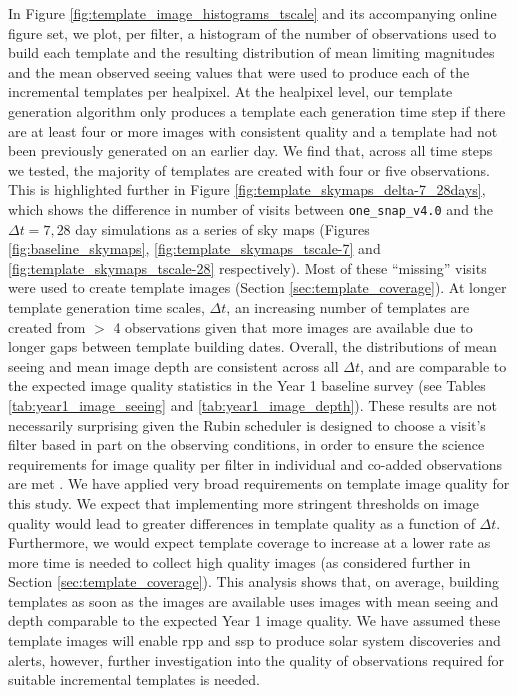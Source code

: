 \documentclass[preprintm,linenumbers]{aastex631}
\newcommand{\baseline}{\texttt{one\_snap\_v4.0}\xspace}
\begin{document}
		In Figure \ref{fig:template_image_histograms_tscale} and its accompanying online figure set, we plot, per filter, a histogram of the number of observations used to build each template and the resulting distribution of mean limiting magnitudes and the mean observed seeing values that were used to produce each of the incremental templates per healpixel. 
  At the healpixel level, our template generation algorithm only produces a template each generation time step if there are at least four or more images with consistent quality and a template had not been previously generated on an earlier day. 
  We find that, across all time steps we tested, the majority of templates are created with four or five observations. 
  This is highlighted further in Figure \ref{fig:template_skymaps_delta-7_28days}, which shows the difference in number of visits between \baseline and the $\Delta t = 7, 28$ day simulations as a series of sky maps (Figures \ref{fig:baseline_skymaps}, \ref{fig:template_skymaps_tscale-7} and \ref{fig:template_skymaps_tscale-28} respectively).
  Most of these ``missing'' visits were used to create template images (Section \ref{sec:template_coverage}).
  At longer template generation time scales, $\Delta t$, an increasing number of templates are created from  $>$ 4 observations given that more images are available due to longer gaps between template building dates. 
  Overall, the distributions of mean seeing and mean image depth are consistent across all $\Delta t$, and are comparable to the expected image quality statistics in the Year 1 baseline survey (see Tables \ref{tab:year1_image_seeing} and \ref{tab:year1_image_depth}). 
  These results are not necessarily surprising given the Rubin scheduler is designed to choose a visit's filter based in part on the observing conditions, in order to ensure the science requirements for image quality per filter in individual and co-added observations are met \citep{lsstSRD}. 
  We have applied very broad requirements on template image quality for this study. 
  We expect that implementing more stringent thresholds on image quality would lead to greater differences in template quality as a function of $\Delta t$.
  Furthermore, we would expect template coverage to increase at a lower rate as more time is needed to collect high quality images (as considered further in Section \ref{sec:template_coverage}).
This analysis shows that, on average, building templates as soon as the images are available uses images with mean seeing and depth comparable to the  expected Year 1 image quality.
We have assumed these template images will enable \gls*{rpp} and \gls*{ssp} to produce solar system discoveries and alerts, however, further investigation into the quality of observations required for suitable incremental templates is needed. 
\end{document}
